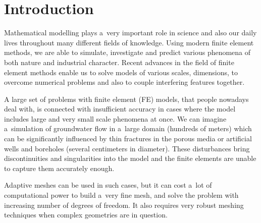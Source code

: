 \documentclass[FM,Dis]{tulthesis}
\begin{document}
\tableofcontents

\clearpage



\chapter{Introduction}





Mathematical modelling plays a~very important role in science and also our daily lives throughout many different
fields of knowledge. Using modern finite element methods, we are able to simulate, investigate and predict
various phenomena of both nature and industrial character. Recent advances in the field of finite element methods
enable us to solve models of various scales, dimensions, to overcome numerical problems and also 
to couple interfering features together.

A large set of problems with finite element (FE) models, that people nowadays deal with, is connected with 
insufficient accuracy in cases where the model includes large and very small scale phenomena at once.
We can imagine a~simulation of groundwater flow in a~large domain (hundreds of meters) which can be significantly
influenced by thin fractures in the porous media or artificial wells and boreholes (several centimeters in diameter).
These disturbances bring discontinuities and singularities into the model and the finite elements are
unable to capture them accurately enough.

Adaptive meshes can be used in such cases, but it can cost a~lot of computational power to build a~very fine mesh,
and solve the problem with increasing number of degrees of freedom.
It also requires very robust meshing techniques when complex geometries are in question.
\end{document}
